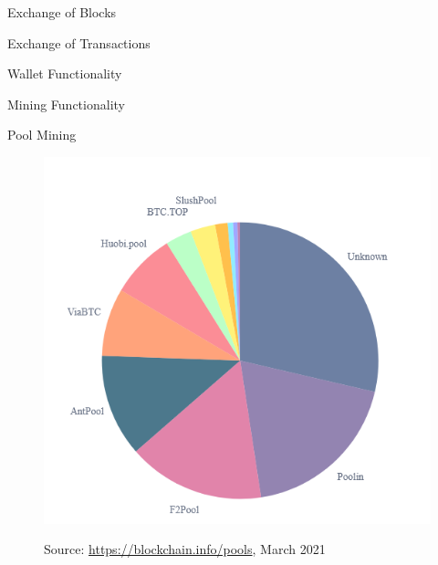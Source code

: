 \documentclass[handout]{beamer}
\begin{document}
\begin{frame}{Exchange of Blocks}
	\begin{center}
		\begin{tikzpicture}[scale=1, every node/.style={scale=1}]
			
		\end{tikzpicture}
	\end{center}
\end{frame}

\begin{frame}{Exchange of Transactions}
	\begin{center}
		\begin{tikzpicture}[scale=1, every node/.style={scale=1}]
			
		\end{tikzpicture}
	\end{center}
\end{frame}


\begin{frame}{Wallet Functionality}
	\centering
	\begin{tikzpicture}[scale=1, every node/.style={scale=1}]
		
	\end{tikzpicture}
\end{frame}

\begin{frame}{Mining Functionality}
	\centering
	\begin{tikzpicture}[scale=1, every node/.style={scale=1}]
		
	\end{tikzpicture}
\end{frame}

\begin{frame}{Pool Mining}
	\centering
	\begin{figure}[t]
		\includegraphics[height = 0.8\textheight]{../assets/images/mining_pools}
		
		Source: \link \url{https://blockchain.info/pools}, March 2021
	\end{figure}
\end{frame}
\end{document}
